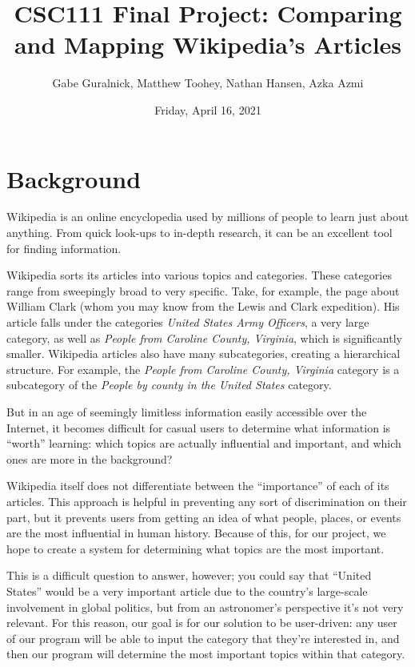 \documentclass[fontsize=11pt]{article}
\title{CSC111 Final Project: Comparing and Mapping Wikipedia's Articles}
\author{Gabe Guralnick, Matthew Toohey, Nathan Hansen, Azka Azmi}
\date{Friday, April 16, 2021}
\begin{document}
\maketitle

\section{Background}

Wikipedia is an online encyclopedia used by millions of people to learn just about anything. From quick look-ups to in-depth research, it can be an excellent tool for finding information. 

Wikipedia sorts its articles into various topics and categories. These categories range from sweepingly broad to very specific. Take, for example, the page about William Clark (whom you may know from the Lewis and Clark expedition). His article falls under the categories \textit{United States Army Officers}, a very large category, as well as \textit{People from Caroline County, Virginia}, which is significantly smaller. Wikipedia articles also have many subcategories, creating a hierarchical structure. For example, the \textit{People from Caroline County, Virginia} category is a subcategory of the \textit{People by county in the United States} category.

But in an age of seemingly limitless information easily accessible over the Internet, it becomes difficult for casual users to determine what information is ``worth'' learning: which topics are actually influential and important, and which ones are more in the background?

Wikipedia itself does not differentiate between the ``importance'' of each of its articles. This approach is helpful in preventing any sort of discrimination on their part, but it prevents users from getting an idea of what people, places, or events are the most influential in human history. Because of this, for our project, we hope to create a system for determining what topics are the most important.

This is a difficult question to answer, however; you could say that ``United States'' would be a very important article due to the country's large-scale involvement in global politics, but from an astronomer's perspective it's not very relevant. For this reason, our goal is for our solution to be user-driven: any user of our program will be able to input the category that they're interested in, and then our program will determine the most important topics within that category.
\end{document}
